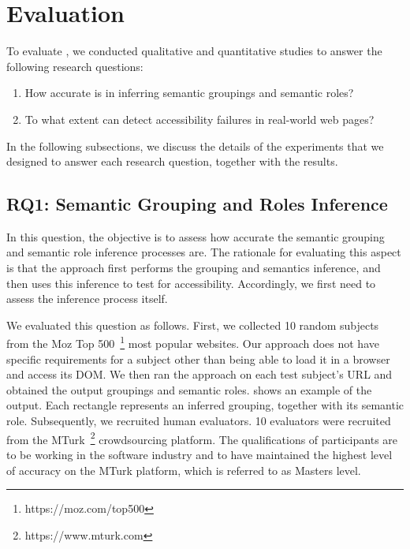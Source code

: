 \section{Evaluation}
\label{sec:evaluation}
To evaluate \toolname, we conducted qualitative and quantitative studies  
to answer the following research questions:

\begin{enumerate}[label=\textbf{RQ\arabic*},leftmargin=*]
	\item How accurate is \toolname in inferring semantic groupings and semantic roles?

	\item To what extent can \toolname detect accessibility failures 
    in real-world web pages?
\end{enumerate}

In the following subsections, we discuss the details of the experiments that 
we designed to answer each research question, together with the results.

\subsection{RQ1: Semantic Grouping and Roles Inference}
In this question, the objective is to assess how accurate the semantic grouping and semantic role inference processes are. 
The rationale for evaluating this aspect is that the approach 
first performs the grouping and semantics inference, and then 
uses this inference to test for accessibility. Accordingly, 
we first need to assess the inference process itself. 

We evaluated this question as follows. 
First, we collected 10 random subjects from the Moz 
Top 500~\footnote{https://moz.com/top500} most popular websites. 
Our approach does not have specific requirements for a subject other 
than being able to load it in a browser and access its DOM.  
We then ran the approach on each test subject's URL and obtained 
the output groupings and semantic roles. 
 shows an example of the output. 
Each rectangle represents an inferred grouping, together 
with its semantic role. 
Subsequently, we recruited human evaluators. 
10 evaluators were recruited from the MTurk~\footnote{https://www.mturk.com} 
crowdsourcing platform. The qualifications of participants 
are to be working in the software industry and to have maintained the 
highest level of accuracy on the MTurk platform, which is referred to 
as Masters level.

